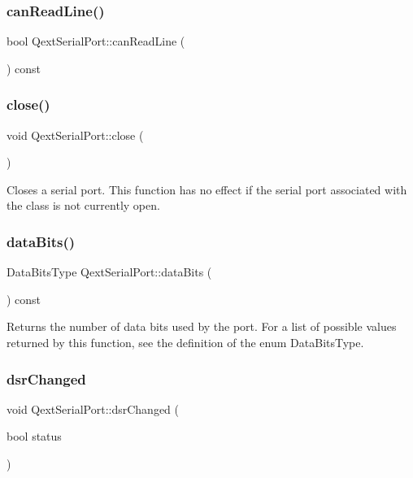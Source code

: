 \subsubsection{\texorpdfstring{can\+Read\+Line()}{canReadLine()}}
{\footnotesize\ttfamily bool Qext\+Serial\+Port\+::can\+Read\+Line (\begin{DoxyParamCaption}{ }\end{DoxyParamCaption}) const}

\mbox{\label{classQextSerialPort_a11eb2a959708db24cdb0de62e10fb1c0}} 
\subsubsection{\texorpdfstring{close()}{close()}}
{\footnotesize\ttfamily void Qext\+Serial\+Port\+::close (\begin{DoxyParamCaption}{ }\end{DoxyParamCaption})}

Closes a serial port. This function has no effect if the serial port associated with the class is not currently open. \mbox{\label{classQextSerialPort_a55dc431a89ac054c1a0e4269a8fcc62e}} 
\subsubsection{\texorpdfstring{data\+Bits()}{dataBits()}}
{\footnotesize\ttfamily Data\+Bits\+Type Qext\+Serial\+Port\+::data\+Bits (\begin{DoxyParamCaption}{ }\end{DoxyParamCaption}) const}

Returns the number of data bits used by the port. For a list of possible values returned by this function, see the definition of the enum Data\+Bits\+Type. \mbox{\label{classQextSerialPort_a4cf10f07eff887097a9cd6509ca2abc6}} 
\subsubsection{\texorpdfstring{dsr\+Changed}{dsrChanged}}
{\footnotesize\ttfamily void Qext\+Serial\+Port\+::dsr\+Changed (\begin{DoxyParamCaption}\item[{bool}]{status }\end{DoxyParamCaption})\hspace{0.3cm}{\ttfamily [signal]}}

